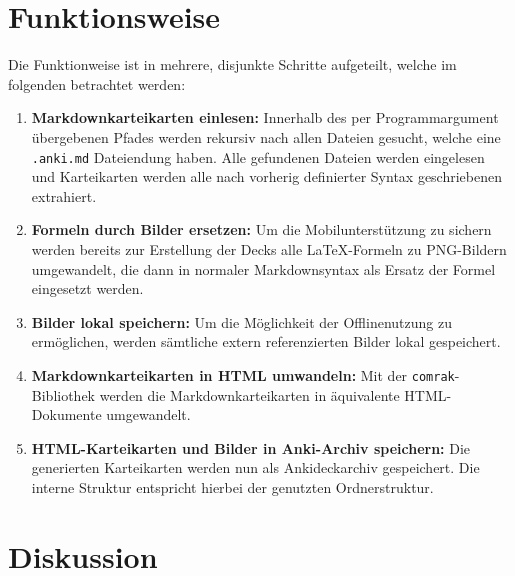 \documentclass[ngerman]{article}
\begin{document}
\section{Funktionsweise}
Die Funktionweise ist in mehrere, disjunkte Schritte aufgeteilt, welche im folgenden betrachtet werden:
\begin{enumerate}
  \item \textbf{Markdownkarteikarten einlesen:} Innerhalb des per Programmargument übergebenen Pfades werden rekursiv nach allen Dateien gesucht, welche eine \texttt{.anki.md} Dateiendung haben. Alle gefundenen Dateien werden eingelesen und Karteikarten werden alle nach vorherig definierter Syntax geschriebenen extrahiert.
  \item \textbf{Formeln durch Bilder ersetzen:} Um die Mobilunterstützung zu sichern werden bereits zur Erstellung der Decks alle \LaTeX-Formeln zu PNG-Bildern umgewandelt, die dann in normaler Markdownsyntax als Ersatz der Formel eingesetzt werden.
  \item \textbf{Bilder lokal speichern:} Um die Möglichkeit der Offlinenutzung zu ermöglichen, werden sämtliche extern referenzierten Bilder lokal gespeichert.
  \item \textbf{Markdownkarteikarten in HTML umwandeln:} Mit der \texttt{comrak}-Bibliothek \cite{comrak} werden die Markdownkarteikarten in äquivalente HTML-Dokumente umgewandelt.
  \item \textbf{HTML-Karteikarten und Bilder in Anki-Archiv speichern:} Die generierten Karteikarten werden nun als Ankideckarchiv gespeichert. Die interne Struktur entspricht hierbei der genutzten Ordnerstruktur.
\end{enumerate}
\section{Diskussion}
\end{document}
